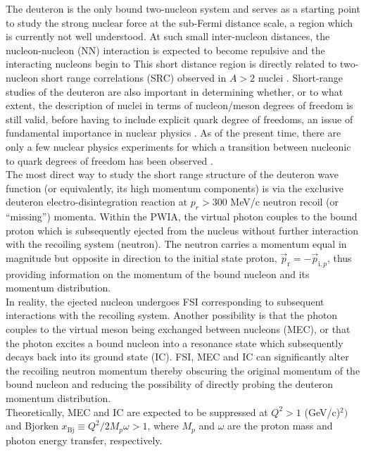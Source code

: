 The deuteron is the only bound two-nucleon  system and serves as a starting point to study the strong nuclear force at the sub-Fermi distance scale, a region which is currently
not well understood. At such small inter-nucleon distances, the nucleon-nucleon (NN) interaction is expected to become repulsive and the interacting
nucleons begin to 
This short distance region is directly related to two-nucleon short range correlations (SRC) observed in $A>2$ nuclei \cite{PhysRevC.68.014313,PhysRevLett.96.082501,PhysRevLett.99.072501,Fomin_2017,Barack_2019,RevModPhys.89.045002}.
Short-range studies of the deuteron are also important in determining whether, or to what extent, the description of nuclei in terms of nucleon/meson degrees of freedom is still valid, before
having to include explicit quark degree of freedoms, an issue of fundamental importance in nuclear physics \cite{sargsian_2015}. As of the present time, there are only a few nuclear physics experiments for
which a transition between nucleonic to quark degrees of freedom has been observed \cite{PhysRevLett.81.4576,PhysRevLett.87.102302,PhysRevC.66.042201}. \\
\indent The most direct way to study the short range structure of the deuteron wave function (or equivalently, its high momentum components) is via the exclusive deuteron
electro-disintegration reaction at $p_{r}>300$ MeV/c neutron recoil (or ``missing'') momenta. Within the PWIA, the virtual photon couples to
the bound proton which is subsequently ejected from the nucleus without further interaction with the recoiling system (neutron). The neutron carries a momentum equal in magnitude but opposite in direction
to the initial state proton, $\vec{p}_{\mathrm{r}} = -\vec{p}_{\mathrm{i},p}$, thus providing information on the momentum of the bound nucleon and its momentum distribution. \\
\indent In reality, the ejected nucleon undergoes FSI corresponding to subsequent interactions with the recoiling system. Another possibility is that the
photon couples to the virtual meson being exchanged between nucleons (MEC), or that the photon excites a bound nucleon into a resonance state which subsequently
decays back into its ground state (IC).  FSI, MEC and IC can significantly alter the recoiling neutron
momentum thereby obscuring the original momentum of the bound nucleon and reducing the possibility of directly probing the deuteron momentum distribution. \\
\indent Theoretically, MEC and IC are expected to be suppressed at $Q^{2}>1$ (GeV/c)$^{2})$ and Bjorken $x_{\mathrm{Bj}}\equiv Q^{2}/2M_{p}\omega>1$, where $M_{p}$ and $\omega$ are the proton mass and photon energy transfer, respectively.

